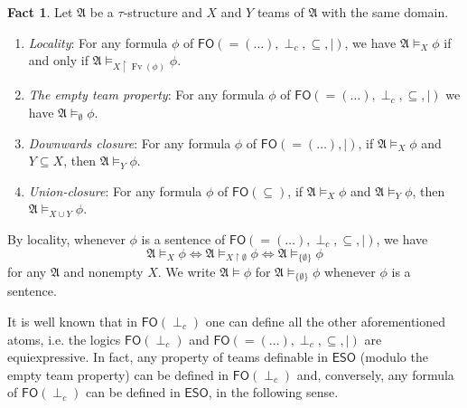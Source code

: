 \documentclass[a4paper]{amsart}
\theoremstyle{definition}
\newtheorem*{fact}{Fact}
\theoremstyle{remark}
\renewcommand{\restriction}{ {\upharpoonright} }
\newcommand{\A}{\mathcal{A}}
\DeclareMathOperator{\dep}{\mathop{=}}
\DeclareMathOperator{\Fv}{Fv}
\newcommand\fol{\mathsf{FO}}
\newcommand\eso{\mathsf{ESO}}
\newcommand\foil{\mathsf{FO}(\perp_c)}
\theoremstyle{definition}
\renewcommand{\A}{\mathfrak{A}}
\begin{document}
\begin{fact}
    Let $\A$ be a $\tau$-structure and $X$ and $Y$ teams of $\A$ with the same domain.
	\begin{enumerate}
	    \item \emph{Locality}: For any formula $\phi$ of $\fol( \dep(\dots), \perp_c, \subseteq, | )$, we have $\A\models_{X} \phi$ if and only if $\A\models_{X\restriction \Fv(\phi)} \phi$.
		\item \emph{The empty team property}: For any formula $\phi$ of $\fol( \dep(\dots), \perp_c, \subseteq, | )$ we have $\A\models_{\emptyset} \phi$.
		\item \emph{Downwards closure}: For any formula $\phi$ of $\fol( \dep(\dots), | )$, if $\A\models_X \phi$ and $Y\subseteq X$, then $\A\models_Y \phi$.
		\item \emph{Union-closure}: For any formula $\phi$ of $\fol(\subseteq )$, if $\A\models_{X} \phi$ and $\A\models_{Y} \phi$, then $\A\models_{X\cup Y} \phi$.
	\end{enumerate}    
\end{fact}

By locality, whenever $\phi$ is a sentence of $\fol( \dep(\dots), \perp_c, \subseteq, | )$, we have
\[
    \A\models_X\phi \iff \A\models_{X\restriction\emptyset}\phi \iff \A\models_{\{\emptyset\}}\phi
\]
for any $\A$ and nonempty $X$. We write $\A\models\phi$ for $\A\models_{\{\emptyset\}}\phi$ whenever $\phi$ is a sentence.

It is well known that in $\foil$ one can define all the other aforementioned atoms, i.e. the logics $\foil$ and $\fol(\dep(\dots), \perp_c, \subseteq, \mid)$ are equiexpressive. In fact, any property of teams definable in $\eso$ (modulo the empty team property) can be defined in $\foil$ and, conversely, any formula of $\foil$ can be defined in $\eso$, in the following sense.
\end{document}
